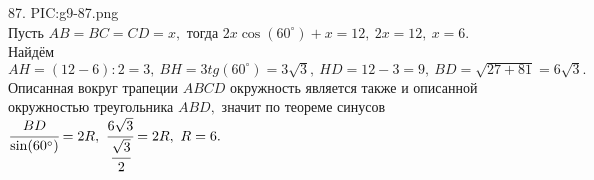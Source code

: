 87. {{PIC:g9-87.png}}\\
Пусть $AB=BC=CD=x,$ тогда $2x\cos(60^\circ)+x=12,\ 2x=12,\ x=6.$ Найдём $AH=(12-6):2=3,\ BH=3tg(60^\circ)=3\sqrt{3},\ HD=12-3=9,\ BD=\sqrt{27+81}=6\sqrt{3}.$ Описанная вокруг трапеции $ABCD$ окружность является также и описанной окружностью треугольника $ABD,$ значит по теореме синусов $\cfrac{BD}{\sin(60^\circ)}=2R,\ \cfrac{6\sqrt{3}}{\cfrac{\sqrt{3}}{2}}=2R,\ R=6.$\\
